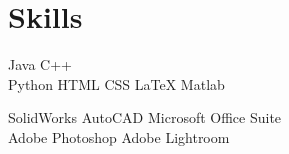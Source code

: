 \documentclass[]{deedy-resume-openfont}
\begin{document}

\section{Skills}

\location{}
\vspace{0.5mm}
\begin{tightemize}
\item[]  Java \textbullet{} C++ \\
 Python \textbullet{} HTML \textbullet{} CSS \textbullet{} \LaTeX \textbullet{} Matlab
\end{tightemize}
\sectionsep

\location{}
\vspace{0.5mm}
\begin{tightemize}
\item[] SolidWorks \textbullet{} AutoCAD \textbullet{} Microsoft Office Suite \\
Adobe Photoshop \textbullet{} Adobe Lightroom
\end{tightemize}
\sectionsep

\end{document}
